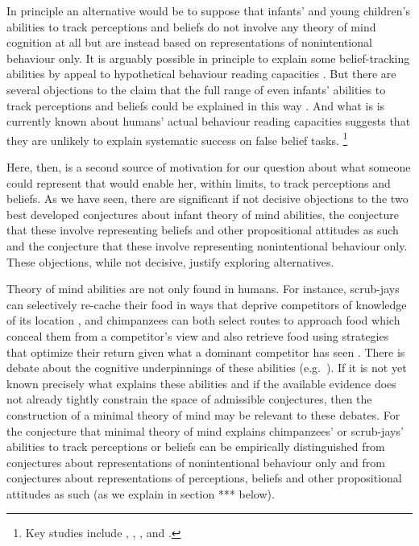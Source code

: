 \documentclass[12pt,\papersize]{extarticle}
\begin{document}
In principle an alternative would be to suppose that infants' and young children's abilities to track perceptions and beliefs 
do not involve any theory of mind cognition at all
but are instead based on 
representations of nonintentional behaviour only.
It is arguably possible in principle to explain some belief-tracking abilities by appeal to hypothetical behaviour reading capacities  \citep{perner:1988_developing,en_1168, en_1169}.
But there are several objections to the claim that the full range of even infants' abilities to track perceptions and beliefs could be explained in this way \citep{en_1691,Apperly:2009ju}.  
And what is is currently known about humans' actual behaviour reading capacities suggests that they are unlikely to explain systematic success on false belief tasks.%
\footnote{
Key studies include
	\citet{Newtson:1976ni}, 
	\citet{Byrne:1999jk},
	\citet{Baldwin:2001rs},
	\citet{Saylor:2007pj} and
	\citet{Baldwin:2008mw}.
} 
 
Here, then, is a second source of motivation for our question about what someone could represent that would enable her, within limits, to track perceptions and beliefs.
As we have seen, there are significant if not decisive objections to the two best developed conjectures about infant theory of mind abilities, the conjecture that these involve representing beliefs and other propositional attitudes as such and the conjecture that these involve representing nonintentional behaviour only.  
These objections, while not decisive, justify exploring alternatives.

Theory of mind abilities are not only found in humans.
For instance,
scrub-jays can selectively re-cache their food in ways that deprive competitors of knowledge of its location \citep{Clayton:2007fh}, and  chimpanzees can both select routes to approach food which conceal them from a competitor’s view \citep[]{en_1546} and also retrieve food using strategies that optimize their return given what a dominant competitor has seen \citep[]{en_1545}.  
There is debate about the cognitive underpinnings of these abilities (e.g.\ 
	\citealp{povinelli:2004vonk, 
			Penn:2007ey,
			Tomasello:2005ce,
			Call:2008di}). 
If it is not yet known precisely what explains these abilities 
and if the available evidence does not already tightly constrain the space of admissible conjectures,
then the construction of a minimal theory of mind may be relevant to these debates.
For the conjecture that minimal theory of mind explains chimpanzees' or scrub-jays' abilities to track perceptions or beliefs can be empirically distinguished from conjectures about representations of nonintentional behaviour only and from conjectures about representations of perceptions, beliefs and other propositional attitudes as such (as we explain in section *** below).
\end{document}
